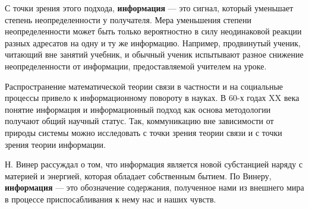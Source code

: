С точки зрения этого подхода, \textbf{информация} --- это сигнал, который уменьшает степень неопределенности у получателя. Мера уменьшения степени неопределенности может быть только вероятностно в силу неодинаковой реакции разных адресатов на одну и ту же информацию. Например, продвинутый ученик, читающий вне занятий учебник, и обычный ученик испытывают разное снижение неопределенности от информации, предоставляемой учителем на уроке. 

Распространение математической теории связи в частности и на социальные процессы привело к информационному повороту в науках. 
В 60-х годах XX века понятие информация и информационный подход как основа методологии получают общий научный статус. Так, коммуникацию вне зависимости от природы системы можно исследовать с точки зрения теории связи и с точки зрения теории информации. 


Н. Винер рассуждал о том, что информация является новой субстанцией наряду с материей и энергией, которая обладает собственным бытием. По Винеру, \textbf{информация} --- это обозначение содержания, полученное нами из внешнего мира в процессе приспосабливания к нему нас и наших чувств.


